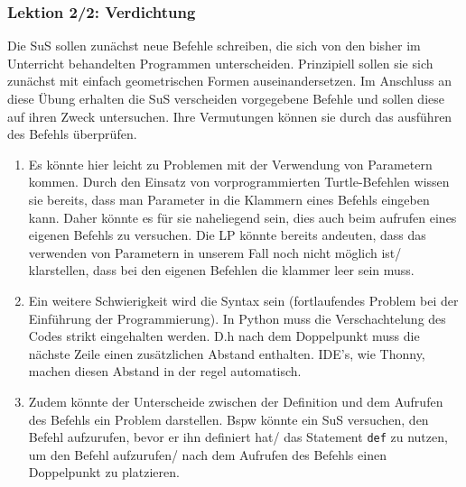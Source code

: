 \begin{myExBox}[title=DL \themycounter]
\subsubsection*{Lektion 2/2: Verdichtung}
Die SuS sollen zunächst neue Befehle schreiben, die sich von den bisher im Unterricht behandelten Programmen unterscheiden. Prinzipiell sollen sie sich zunächst mit einfach geometrischen Formen auseinandersetzen. Im Anschluss an diese Übung erhalten die SuS verscheiden vorgegebene Befehle und sollen diese auf ihren Zweck untersuchen. Ihre Vermutungen können sie durch das ausführen des Befehls überprüfen.

\begin{myExBox}[title=Mögliche Schwierigkeiten \& geeignete Massnahmen]
\begin{enumerate}
    \item Es könnte hier leicht zu Problemen mit der Verwendung von Parametern kommen. Durch den Einsatz von vorprogrammierten Turtle-Befehlen wissen sie bereits, dass man Parameter in die Klammern eines Befehls eingeben kann. Daher könnte es für sie naheliegend sein, dies auch beim aufrufen eines eigenen Befehls zu versuchen. Die LP könnte bereits andeuten, dass das verwenden von Parametern in unserem Fall noch nicht möglich ist/ klarstellen, dass bei den eigenen Befehlen die klammer leer sein muss.
    \item Ein weitere Schwierigkeit wird die Syntax sein (fortlaufendes Problem bei der Einführung der Programmierung). In Python muss die Verschachtelung des Codes strikt eingehalten werden. D.h nach dem Doppelpunkt muss die nächste Zeile einen zusätzlichen Abstand enthalten. IDE's, wie Thonny, machen diesen Abstand in der regel automatisch.
    \item Zudem könnte der Unterscheide zwischen der Definition und dem Aufrufen des Befehls ein Problem darstellen. Bspw könnte ein SuS versuchen, den Befehl aufzurufen, bevor er ihn definiert hat/ das Statement \lstinline|def| zu nutzen, um den Befehl aufzurufen/ nach dem Aufrufen des Befehls einen Doppelpunkt zu platzieren. 
\end{enumerate}
\end{myExBox}
\end{myExBox}
\newpage{}

